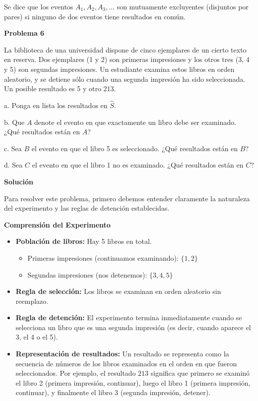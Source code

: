 \documentclass[a4paper]{article}
\begin{document}
Se dice que los eventos $A_1, A_2, A_3, \dots$ son mutuamente excluyentes (disjuntos por pares) si ninguno de dos eventos tiene resultados en común. 


\textbf{Problema 6}

La biblioteca de una universidad dispone de cinco ejemplares de un cierto texto en reserva. Dos ejemplares (1 y 2) son primeras impresiones y los otros tres (3, 4 y 5) son segundas impresiones. Un estudiante examina estos libros en orden aleatorio, y se detiene sólo cuando una segunda impresión ha sido seleccionada. Un posible resultado es 5 y otro 213.

a. Ponga en lista los resultados en $\hat{S}$.

b. Que $A$ denote el evento en que exactamente un libro debe ser examinado. ¿Qué resultados están en $A$?

c. Sea $B$ el evento en que el libro 5 es seleccionado. ¿Qué resultados están en $B$?

d. Sea $C$ el evento en que el libro 1 no es examinado. ¿Qué resultados están en $C$?

\vspace{0.5cm}

\textbf{Solución}

Para resolver este problema, primero debemos entender claramente la naturaleza del experimento y las reglas de detención establecidas.

\textbf{Comprensión del Experimento}

\begin{itemize}
    \item \textbf{Población de libros:} Hay 5 libros en total.
    \begin{itemize}
        \item Primeras impresiones (continuamos examinando): $\{1, 2\}$
        \item Segundas impresiones (nos detenemos): $\{3, 4, 5\}$
    \end{itemize}
    \item \textbf{Regla de selección:} Los libros se examinan en orden aleatorio sin reemplazo.
    \item \textbf{Regla de detención:} El experimento termina inmediatamente cuando se selecciona un libro que es una segunda impresión (es decir, cuando aparece el 3, el 4 o el 5).
    \item \textbf{Representación de resultados:} Un resultado se representa como la secuencia de números de los libros examinados en el orden en que fueron seleccionados. Por ejemplo, el resultado $213$ significa que primero se examinó el libro 2 (primera impresión, continuar), luego el libro 1 (primera impresión, continuar), y finalmente el libro 3 (segunda impresión, detener).
\end{itemize}
\end{document}
